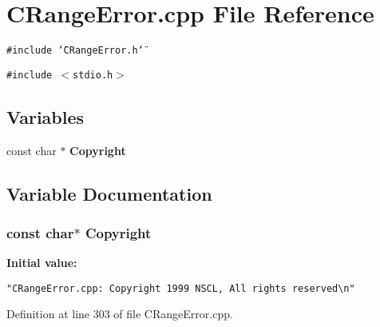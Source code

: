 \section{CRange\-Error.cpp File Reference}
\label{CRangeError_8cpp}
{\tt \#include \char`\"{}CRange\-Error.h\char`\"{}}\par
{\tt \#include $<$stdio.h$>$}\par
\subsection*{Variables}
\begin{CompactItemize}
\item 
const char $\ast$ {\bf Copyright}
\end{CompactItemize}


\subsection{Variable Documentation}
\subsubsection{\setlength{\rightskip}{0pt plus 5cm}const char$\ast$ Copyright\hspace{0.3cm}{\tt  [static]}}\label{CRangeError_8cpp_a0}


{\bf Initial value:}

\footnotesize\begin{verbatim} 
"CRangeError.cpp: Copyright 1999 NSCL, All rights reserved\n"\end{verbatim}\normalsize 


Definition at line 303 of file CRange\-Error.cpp.